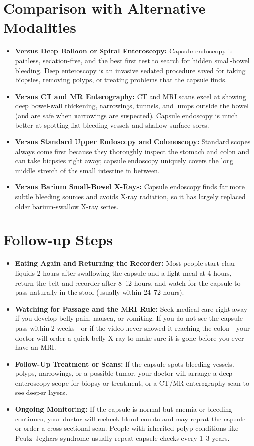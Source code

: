 \section{Comparison with Alternative Modalities}
\begin{itemize}
    \item \textbf{Versus Deep Balloon or Spiral Enteroscopy:} Capsule endoscopy is painless, sedation-free, and the best first test to search for hidden small-bowel bleeding. Deep enteroscopy is an invasive sedated procedure saved for taking biopsies, removing polyps, or treating problems that the capsule finds.
    \item \textbf{Versus CT and MR Enterography:} CT and MRI scans excel at showing deep bowel-wall thickening, narrowings, tunnels, and lumps outside the bowel (and are safe when narrowings are suspected). Capsule endoscopy is much better at spotting flat bleeding vessels and shallow surface sores.
    \item \textbf{Versus Standard Upper Endoscopy and Colonoscopy:} Standard scopes always come first because they thoroughly inspect the stomach and colon and can take biopsies right away; capsule endoscopy uniquely covers the long middle stretch of the small intestine in between.
    \item \textbf{Versus Barium Small-Bowel X-Rays:} Capsule endoscopy finds far more subtle bleeding sources and avoids X-ray radiation, so it has largely replaced older barium-swallow X-ray series.
\end{itemize}

\section{Follow-up Steps}
\begin{itemize}
    \item \textbf{Eating Again and Returning the Recorder:} Most people start clear liquids 2 hours after swallowing the capsule and a light meal at 4 hours, return the belt and recorder after 8--12 hours, and watch for the capsule to pass naturally in the stool (usually within 24--72 hours).
    \item \textbf{Watching for Passage and the MRI Rule:} Seek medical care right away if you develop belly pain, nausea, or vomiting. If you do not see the capsule pass within 2 weeks---or if the video never showed it reaching the colon---your doctor will order a quick belly X-ray to make sure it is gone before you ever have an MRI.
    \item \textbf{Follow-Up Treatment or Scans:} If the capsule spots bleeding vessels, polyps, narrowings, or a possible tumor, your doctor will arrange a deep enteroscopy scope for biopsy or treatment, or a CT/MR enterography scan to see deeper layers.
    \item \textbf{Ongoing Monitoring:} If the capsule is normal but anemia or bleeding continues, your doctor will recheck blood counts and may repeat the capsule or order a cross-sectional scan. People with inherited polyp conditions like Peutz--Jeghers syndrome usually repeat capsule checks every 1--3 years.
\end{itemize}

